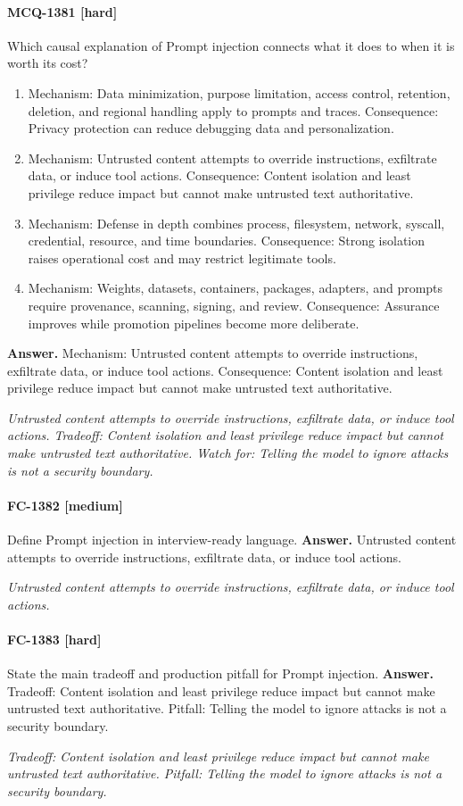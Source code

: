 \paragraph{MCQ-1381 [hard]} Which causal explanation of Prompt injection connects what it does to when it is worth its cost?
\begin{enumerate}[label=\Alph*.]
\item Mechanism: Data minimization, purpose limitation, access control, retention, deletion, and regional handling apply to prompts and traces. Consequence: Privacy protection can reduce debugging data and personalization.
\item Mechanism: Untrusted content attempts to override instructions, exfiltrate data, or induce tool actions. Consequence: Content isolation and least privilege reduce impact but cannot make untrusted text authoritative.
\item Mechanism: Defense in depth combines process, filesystem, network, syscall, credential, resource, and time boundaries. Consequence: Strong isolation raises operational cost and may restrict legitimate tools.
\item Mechanism: Weights, datasets, containers, packages, adapters, and prompts require provenance, scanning, signing, and review. Consequence: Assurance improves while promotion pipelines become more deliberate.
\end{enumerate}
\noindent\textbf{Answer.} Mechanism: Untrusted content attempts to override instructions, exfiltrate data, or induce tool actions. Consequence: Content isolation and least privilege reduce impact but cannot make untrusted text authoritative.
\par\textit{Untrusted content attempts to override instructions, exfiltrate data, or induce tool actions. Tradeoff: Content isolation and least privilege reduce impact but cannot make untrusted text authoritative. Watch for: Telling the model to ignore attacks is not a security boundary.}
\paragraph{FC-1382 [medium]} Define Prompt injection in interview-ready language.
\noindent\textbf{Answer.} Untrusted content attempts to override instructions, exfiltrate data, or induce tool actions.
\par\textit{Untrusted content attempts to override instructions, exfiltrate data, or induce tool actions.}
\paragraph{FC-1383 [hard]} State the main tradeoff and production pitfall for Prompt injection.
\noindent\textbf{Answer.} Tradeoff: Content isolation and least privilege reduce impact but cannot make untrusted text authoritative. Pitfall: Telling the model to ignore attacks is not a security boundary.
\par\textit{Tradeoff: Content isolation and least privilege reduce impact but cannot make untrusted text authoritative. Pitfall: Telling the model to ignore attacks is not a security boundary.}
